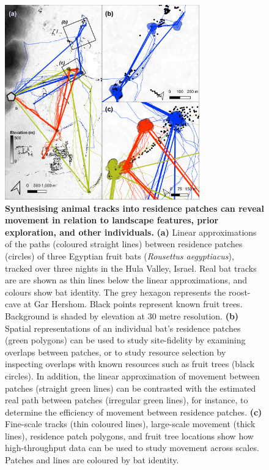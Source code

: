 \begin{figure}[h!]
    \centering
    \includegraphics[width=0.75\textwidth]{figures/preprocessing/fig_08.png}
    \caption{
        \textbf{Synthesising animal tracks into residence patches can reveal movement in relation to landscape features, prior exploration, and other individuals.}
        \textbf{(a)} Linear approximations of the paths (coloured straight lines) between residence patches (circles) of three Egyptian fruit bats (\textit{Rousettus aegyptiacus}), tracked over three nights in the Hula Valley, Israel.
        Real bat tracks are are shown as thin lines below the linear approximations, and colours show bat identity. The grey hexagon represents the roost-cave at Gar Hershom.
        Black points represent known fruit trees.
        Background is shaded by elevation at 30 metre resolution.
        \textbf{(b)} Spatial representations of an individual bat's residence patches (green polygons) can be used to study site-fidelity by examining overlaps between patches, or to study resource selection by inspecting overlaps with known resources such as fruit trees (black circles).
        In addition, the linear approximation of movement between patches (straight green lines) can be contrasted with the estimated real path between patches (irregular green lines), for instance, to determine the efficiency of movement between residence patches.
        \textbf{(c)} Fine-scale tracks (thin coloured lines), large-scale movement (thick lines), residence patch polygons, and fruit tree locations show how high-throughput data can be used to study movement across scales.
        Patches and lines are coloured by bat identity.
    }
    \label{preproc_fig_08}
\end{figure}

